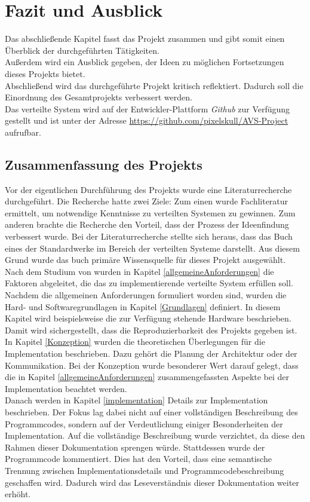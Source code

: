 \chapter{Fazit und Ausblick}
Das abschließende Kapitel fasst das Projekt zusammen und gibt somit einen Überblick der durchgeführten Tätigkeiten.\\
 Außerdem wird ein Ausblick gegeben, der Ideen zu möglichen Fortsetzungen dieses Projekts bietet. \\
 Abschließend wird das durchgeführte Projekt kritisch reflektiert. Dadurch soll die Einordnung des Gesamtprojekts verbessert werden.\\
 
Das verteilte System wird auf der Entwickler-Plattform \emph{Github} zur Verfügung gestellt und ist unter der Adresse \url{https://github.com/pixelskull/AVS-Project} aufrufbar.

\section{Zusammenfassung des Projekts}
Vor der eigentlichen Durchführung des Projekts wurde eine Literaturrecherche durchgeführt. Die Recherche hatte zwei Ziele: Zum einen wurde Fachliteratur ermittelt, um notwendige Kenntnisse zu verteilten Systemen zu gewinnen. Zum anderen brachte die Recherche den Vorteil, dass der Prozess der Ideenfindung verbessert wurde. Bei der Literaturrecherche stellte sich heraus, dass das Buch \citep{tanenbaum} eines der Standardwerke im Bereich der verteilten Systeme darstellt. Aus diesem Grund wurde das buch primäre Wissensquelle für dieses Projekt ausgewählt. \\
Nach dem Studium von \citep{tanenbaum} wurden in Kapitel \ref{allgemeineAnforderungen} die Faktoren abgeleitet, die das zu implementierende verteilte System erfüllen soll. \\
Nachdem die allgemeinen Anforderungen formuliert worden sind, wurden die Hard- und Softwaregrundlagen in Kapitel \ref{Grundlagen} definiert. In diesem Kapitel wird beispielsweise die zur Verfügung stehende Hardware beschrieben. Damit wird sichergestellt, dass die Reproduzierbarkeit des Projekts gegeben ist. \\
In Kapitel \ref{Konzeption} wurden die theoretischen Überlegungen für die Implementation beschrieben. Dazu gehört die Planung der Architektur oder der Kommunikation. Bei der Konzeption wurde besonderer Wert darauf gelegt, dass die in Kapitel \ref{allgemeineAnforderungen} zusammengefassten Aspekte bei der Implementation beachtet werden. \\
Danach werden in Kapitel \ref{implementation} Details zur Implementation beschrieben. Der Fokus lag dabei nicht auf einer vollständigen Beschreibung des Programmcodes, sondern auf der Verdeutlichung einiger Besonderheiten der Implementation. Auf die vollständige Beschreibung wurde verzichtet, da diese den Rahmen dieser Dokumentation sprengen würde. Stattdessen wurde der Programmcode kommentiert. Dies hat den Vorteil, dass eine semantische Trennung zwischen Implementationsdetails und Programmcodebeschreibung geschaffen wird. Dadurch wird das Leseverständnis dieser Dokumentation weiter erhöht. 

